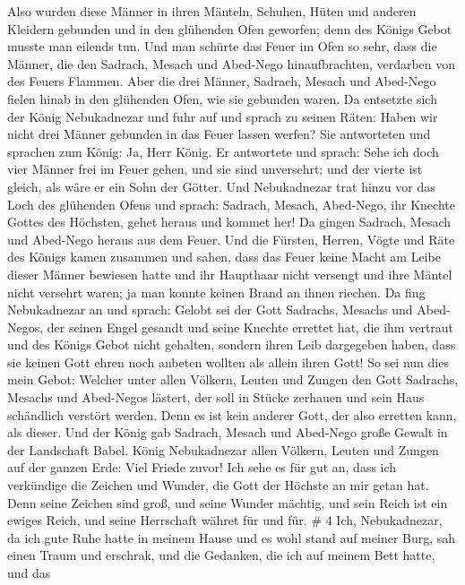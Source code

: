 Also wurden diese Männer in ihren Mänteln, Schuhen, Hüten und anderen
Kleidern gebunden und in den glühenden Ofen geworfen;  denn
des Königs Gebot musste man eilends tun. Und man schürte das Feuer im
Ofen so sehr, dass die Männer, die den Sadrach, Mesach und Abed-Nego
hinaufbrachten, verdarben von des Feuers Flammen.  Aber die
drei Männer, Sadrach, Mesach und Abed-Nego fielen hinab in den glühenden
Ofen, wie sie gebunden waren.  Da entsetzte sich der König
Nebukadnezar und fuhr auf und sprach zu seinen Räten: Haben wir nicht
drei Männer gebunden in das Feuer lassen werfen? Sie antworteten und
sprachen zum König: Ja, Herr König.  Er antwortete und
sprach: Sehe ich doch vier Männer frei im Feuer gehen, und sie sind
unversehrt; und der vierte ist gleich, als wäre er ein Sohn der Götter.
 Und Nebukadnezar trat hinzu vor das Loch des glühenden
Ofens und sprach: Sadrach, Mesach, Abed-Nego, ihr Knechte Gottes des
Höchsten, gehet heraus und kommet her! Da gingen Sadrach, Mesach und
Abed-Nego heraus aus dem Feuer.  Und die Fürsten, Herren,
Vögte und Räte des Königs kamen zusammen und sahen, dass das Feuer keine
Macht am Leibe dieser Männer bewiesen hatte und ihr Haupthaar nicht
versengt und ihre Mäntel nicht versehrt waren; ja man konnte keinen
Brand an ihnen riechen.  Da fing Nebukadnezar an und
sprach: Gelobt sei der Gott Sadrachs, Mesachs und Abed-Negos, der seinen
Engel gesandt und seine Knechte errettet hat, die ihm vertraut und des
Königs Gebot nicht gehalten, sondern ihren Leib dargegeben haben, dass
sie keinen Gott ehren noch anbeten wollten als allein ihren Gott!
 So sei nun dies mein Gebot: Welcher unter allen Völkern,
Leuten und Zungen den Gott Sadrachs, Mesachs und Abed-Negos lästert, der
soll in Stücke zerhauen und sein Haus schändlich verstört werden. Denn
es ist kein anderer Gott, der also erretten kann, als dieser.
 Und der König gab Sadrach, Mesach und Abed-Nego große
Gewalt in der Landschaft Babel.  König Nebukadnezar allen
Völkern, Leuten und Zungen auf der ganzen Erde: Viel Friede zuvor!
 Ich sehe es für gut an, dass ich verkündige die Zeichen
und Wunder, die Gott der Höchste an mir getan hat.  Denn
seine Zeichen sind groß, und seine Wunder mächtig, und sein Reich ist
ein ewiges Reich, und seine Herrschaft währet für und für. \# 4
 Ich, Nebukadnezar, da ich gute Ruhe hatte in meinem Hause
und es wohl stand auf meiner Burg,  sah einen Traum und
erschrak, und die Gedanken, die ich auf meinem Bett hatte, und das
